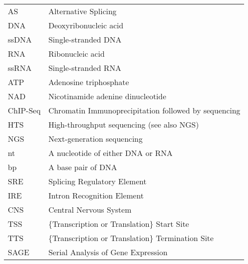 \documentclass[12pt, letter, oneside]{Thesis} %
\begin{document}
\pagestyle{fancy} 
	\tableofcontents %
	\listoffigures %
	\listoftables %
\clearpage %
\label{hd:abrevs} \listAbreviations
\begin{table}[h]
\begin{tabular}{l|l}
AS       & Alternative Splicing                                 \\
DNA      & Deoxyribonucleic acid                                \\
ssDNA    & Single-stranded DNA                                  \\
RNA      & Ribonucleic acid                                     \\
ssRNA    & Single-stranded RNA                                  \\
ATP      & Adenosine triphosphate                               \\
NAD      & Nicotinamide adenine dinucleotide                    \\
ChIP-Seq & Chromatin Immunoprecipitation followed by sequencing \\
HTS      & High-throughput sequencing (see also NGS)            \\
NGS      & Next-generation sequencing                           \\
nt       & A nucleotide of either DNA or RNA                    \\
bp       & A base pair of DNA                                   \\
SRE      & Splicing Regulatory Element                          \\
IRE      & Intron Recognition Element                           \\
CNS      & Central Nervous System                               \\
TSS      & \{Transcription or Translation\} Start Site          \\
TTS      & \{Transcription or Translation\} Termination Site    \\
SAGE     & Serial Analysis of Gene Expression                   \\
\end{tabular}
\end{table}
\end{document}
